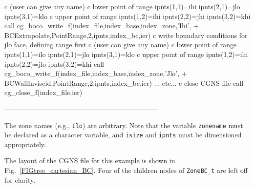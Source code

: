 \documentclass[12pt]{article}
\begin{document}
{\newline c  (user can give any name)
\newline c  lower point of range
\newline\indent      ipnts(1,1)=ihi
\newline\indent      ipnts(2,1)=jlo
\newline\indent      ipnts(3,1)=klo
\newline c  upper point of range
\newline\indent      ipnts(1,2)=ihi
\newline\indent      ipnts(2,2)=jhi
\newline\indent      ipnts(3,2)=khi
\newline\indent      call cg\_boco\_write\_f(index\_file,index\_base,index\_zone,'Ihi',
\newline + \indent BCExtrapolate,PointRange,2,ipnts,index\_bc,ier)
\newline c  write boundary conditions for jlo face, defining range first 
\newline c  (user can give any name)
\newline c  lower point of range
\newline\indent      ipnts(1,1)=ilo
\newline\indent      ipnts(2,1)=jlo
\newline\indent      ipnts(3,1)=klo
\newline c  upper point of range
\newline\indent      ipnts(1,2)=ihi
\newline\indent      ipnts(2,2)=jlo
\newline\indent      ipnts(3,2)=khi
\newline\indent      call cg\_boco\_write\_f(index\_file,index\_base,index\_zone,'Jlo',
\newline + \indent BCWallInviscid,PointRange,2,ipnts,index\_bc,ier)
\newline\indent\indent  ... etc...
\newline c  close CGNS file
\newline\indent      call cg\_close\_f(index\_file,ier)}

--------------------------------------------------------------------

\noindent The zone names (e.g., {\tt Ilo}) are arbitrary.  Note that 
the variable {\tt zonename} must be declared as a character variable, and
{\tt isize} and {\tt ipnts} must be dimensioned appropriately.

The layout of the CGNS file for this example 
is shown in Fig.~\ref{FIGtree_cartesian_BC}.
Four of the children nodes of {\tt ZoneBC\_t} are left off for
clarity.
\end{document}
